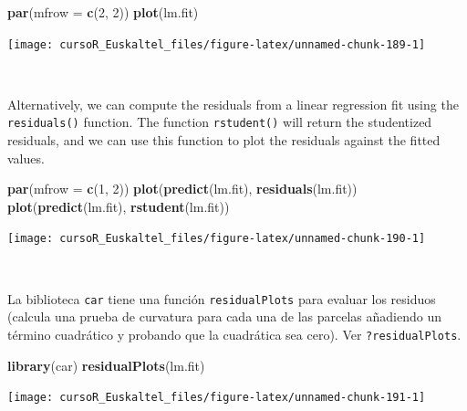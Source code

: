 \documentclass[]{book}
\newenvironment{Shaded}{\begin{snugshade}}{\end{snugshade}}
\newcommand{\KeywordTok}[1]{\textcolor[rgb]{0.13,0.29,0.53}{\textbf{#1}}}
\newcommand{\DataTypeTok}[1]{\textcolor[rgb]{0.13,0.29,0.53}{#1}}
\newcommand{\DecValTok}[1]{\textcolor[rgb]{0.00,0.00,0.81}{#1}}
\newcommand{\NormalTok}[1]{#1}
\begin{document}
\begin{Shaded}
\begin{Highlighting}[]
\KeywordTok{par}\NormalTok{(}\DataTypeTok{mfrow =} \KeywordTok{c}\NormalTok{(}\DecValTok{2}\NormalTok{, }\DecValTok{2}\NormalTok{))}
\KeywordTok{plot}\NormalTok{(lm.fit)}
\end{Highlighting}
\end{Shaded}

\begin{center}\texttt{[image: cursoR\_Euskaltel\_files/figure-latex/unnamed-chunk-189-1]} \end{center}

~

Alternatively, we can compute the residuals from a linear regression fit
using the \texttt{residuals()} function. The function
\texttt{rstudent()} will return the studentized residuals, and we can
use this function to plot the residuals against the fitted values.

\begin{Shaded}
\begin{Highlighting}[]
\KeywordTok{par}\NormalTok{(}\DataTypeTok{mfrow =} \KeywordTok{c}\NormalTok{(}\DecValTok{1}\NormalTok{, }\DecValTok{2}\NormalTok{))}
\KeywordTok{plot}\NormalTok{(}\KeywordTok{predict}\NormalTok{(lm.fit), }\KeywordTok{residuals}\NormalTok{(lm.fit))}
\KeywordTok{plot}\NormalTok{(}\KeywordTok{predict}\NormalTok{(lm.fit), }\KeywordTok{rstudent}\NormalTok{(lm.fit))}
\end{Highlighting}
\end{Shaded}

\begin{center}\texttt{[image: cursoR\_Euskaltel\_files/figure-latex/unnamed-chunk-190-1]} \end{center}

~

La biblioteca \texttt{car} tiene una función \texttt{residualPlots} para
evaluar los residuos (calcula una prueba de curvatura para cada una de
las parcelas añadiendo un término cuadrático y probando que la
cuadrática sea cero). Ver \texttt{?residualPlots}.

\begin{Shaded}
\begin{Highlighting}[]
\KeywordTok{library}\NormalTok{(car)}
\KeywordTok{residualPlots}\NormalTok{(lm.fit)}
\end{Highlighting}
\end{Shaded}

\begin{center}\texttt{[image: cursoR\_Euskaltel\_files/figure-latex/unnamed-chunk-191-1]} \end{center}
\end{document}
